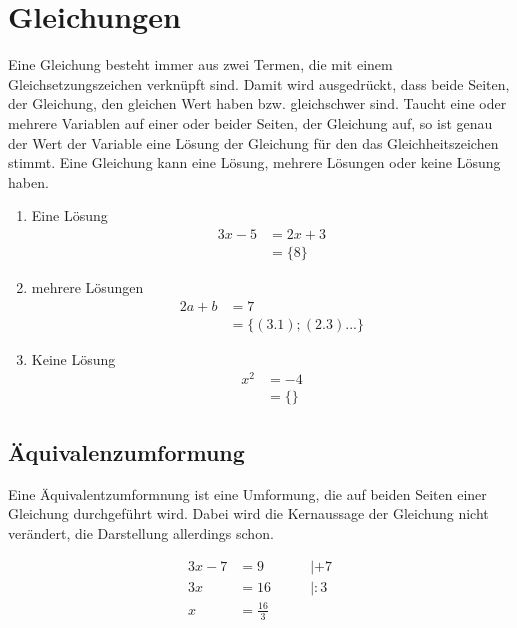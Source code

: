 \section{Gleichungen} Eine Gleichung besteht immer aus zwei Termen, die mit einem Gleichsetzungszeichen verknüpft sind. Damit wird ausgedrückt, dass beide Seiten, der Gleichung, den gleichen Wert haben bzw. gleichschwer sind. Taucht eine oder mehrere Variablen auf einer oder beider Seiten, der Gleichung auf, so ist genau der Wert der Variable eine Lösung der Gleichung für den das Gleichheitszeichen stimmt. 
Eine Gleichung kann eine Lösung, mehrere Lösungen oder keine Lösung haben. 

\begin{beispiel}
	\begin{enumerate}
		\item Eine Lösung 
			\begin{align*}
				3x-5&=2x+3\\
				&=\{8\}
			\end{align*}
		\item mehrere Lösungen 
			\begin{align*}
				2a+b&=7\\
				&=\{(3.1);(2.3)...\}
			\end{align*}
		\item Keine Lösung
			\begin{align*}
				x^2&=-4\\
				&=\{\}
			\end{align*}
	\end{enumerate}
\end{beispiel}
\subsection{Äquivalenzumformung}
Eine Äquivalentzumformnung ist eine Umformung, die auf beiden Seiten einer Gleichung durchgeführt wird. Dabei wird die Kernaussage der Gleichung nicht verändert, die Darstellung allerdings schon.

\begin{beispiel}
	\begin{alignat*}
		3x-7&=9\qquad &| +7\\
		3x&=16 \qquad &|:3\\
		x&=\frac{16}{3}
	\end{alignat*}
\end{beispiel}
